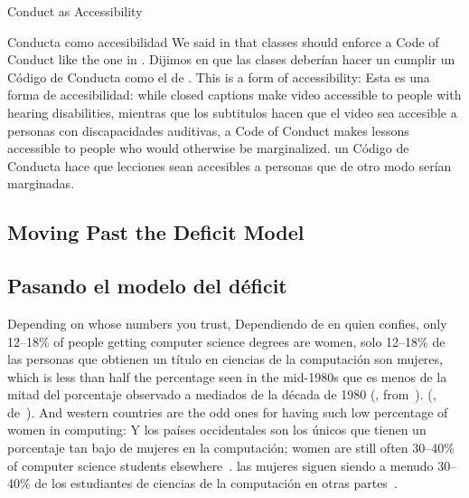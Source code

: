 \begin{aside}{Conduct as Accessibility}
\begin{aside}{Conducta como accesibilidad}
  We said in  that classes should enforce a Code of Conduct like the one in .
  Dijimos en  que las clases deberían hacer un cumplir un Código de Conducta como el de .
  This is a form of accessibility:
  Esta es una forma de accesibilidad:
  while closed captions make video accessible to people with hearing disabilities,
  mientras que los subtitulos hacen que el video sea accesible a personas con discapacidades auditivas,
  a Code of Conduct makes lessons accessible to people who would otherwise be marginalized.
  un Código de Conducta hace que lecciones sean accesibles a personas que de otro modo serían marginadas.
\end{aside}

\subsection*{Moving Past the Deficit Model}
\subsection*{Pasando el modelo del déficit}

Depending on whose numbers you trust,
Dependiendo de en quien confies,
only 12--18\% of people getting computer science degrees are women,
solo 12--18\% de las personas que obtienen un título en ciencias de la computación son mujeres,
which is less than half the percentage seen in the mid-1980s
que es menos de la mitad del porcentaje observado a mediados de la década de 1980
(, from~\cite{Robe2017}).
(, de~\cite{Robe2017}).
And western countries are the odd ones for having such low percentage of women in computing:
Y los países occidentales son los únicos que tienen un porcentaje tan bajo de mujeres en la computación;
women are still often 30--40\% of computer science students elsewhere~\cite{Galp2002,Varm2015}.
las mujeres siguen siendo a menudo 30--40\% de los estudiantes de ciencias de la computación en otras partes~\cite{Galp2002,Varm2015}.



\end{aside}
